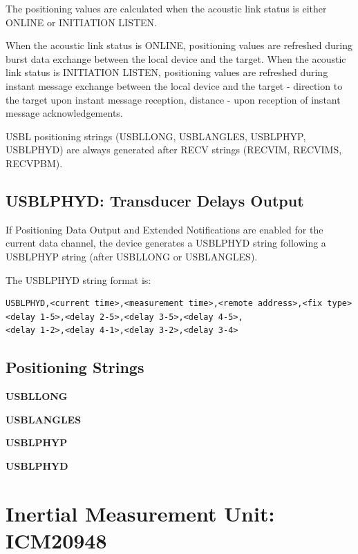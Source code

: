 \documentclass[11pt, oneside]{article}   	%
\begin{document}
The positioning values are calculated when the acoustic link status is either ONLINE or INITIATION
LISTEN.

When the acoustic link status is ONLINE, positioning values are refreshed during burst data exchange between the local device and the target. When the acoustic link status is INITIATION LISTEN, positioning values are refreshed during instant message exchange between the local device and the target - direction to the target upon instant message reception, distance - upon reception of instant message acknowledgements.

USBL positioning strings (USBLLONG, USBLANGLES, USBLPHYP, USBLPHYD) are always generated after RECV strings (RECVIM, RECVIMS, RECVPBM).

\subsection{USBLPHYD: Transducer Delays Output}
If Positioning Data Output and Extended Notifications are enabled for the current data channel, the device generates a USBLPHYD string following a USBLPHYP string (after USBLLONG or USBLANGLES).

The USBLPHYD string format is:
\begin{verbatim}
USBLPHYD,<current time>,<measurement time>,<remote address>,<fix type>
<delay 1-5>,<delay 2-5>,<delay 3-5>,<delay 4-5>,
<delay 1-2>,<delay 4-1>,<delay 3-2>,<delay 3-4>
\end{verbatim}

\subsection{Positioning Strings}

\textbf{USBLLONG}

\textbf{USBLANGLES}


\textbf{USBLPHYP}

\textbf{USBLPHYD}


\newpage
\section{Inertial Measurement Unit: ICM20948}
\end{document}
